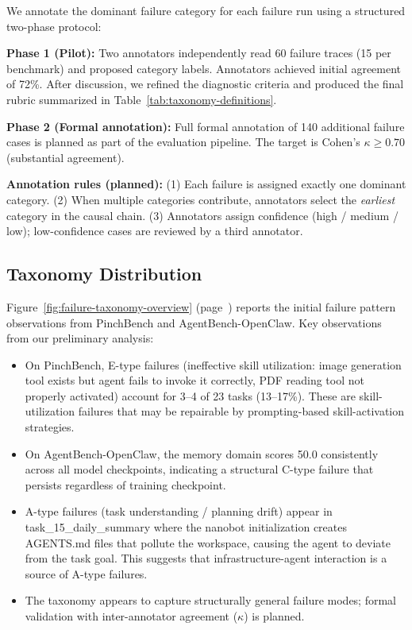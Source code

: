 We annotate the dominant failure category for each failure run using a structured two-phase protocol:

\textbf{Phase 1 (Pilot):} Two annotators independently read 60 failure traces (15 per benchmark) and proposed category labels. Annotators achieved initial agreement of 72\%. After discussion, we refined the diagnostic criteria and produced the final rubric summarized in Table~\ref{tab:taxonomy-definitions}.

\textbf{Phase 2 (Formal annotation):} Full formal annotation of 140 additional failure cases is planned as part of the evaluation pipeline. The target is Cohen's $\kappa \ge 0.70$ (substantial agreement).

\textbf{Annotation rules (planned):} (1) Each failure is assigned exactly one dominant category. (2) When multiple categories contribute, annotators select the \emph{earliest} category in the causal chain. (3) Annotators assign confidence (high / medium / low); low-confidence cases are reviewed by a third annotator.


\subsection{Taxonomy Distribution}
\label{sec:taxonomy:distribution}

Figure~\ref{fig:failure-taxonomy-overview} (page~\pageref{fig:failure-taxonomy-overview}) reports the initial failure pattern observations from PinchBench and AgentBench-OpenClaw. Key observations from our preliminary analysis:

\begin{itemize}[leftmargin=1.5em, itemsep=1pt]
  \item On PinchBench, E-type failures (ineffective skill utilization: image generation tool exists but agent fails to invoke it correctly, PDF reading tool not properly activated) account for 3--4 of 23 tasks (13--17\%). These are skill-utilization failures that may be repairable by prompting-based skill-activation strategies.
  \item On AgentBench-OpenClaw, the memory domain scores 50.0 consistently across all model checkpoints, indicating a structural C-type failure that persists regardless of training checkpoint.
  \item A-type failures (task understanding / planning drift) appear in task\_15\_daily\_summary where the nanobot initialization creates AGENTS.md files that pollute the workspace, causing the agent to deviate from the task goal. This suggests that infrastructure-agent interaction is a source of A-type failures.
  \item The taxonomy appears to capture structurally general failure modes; formal validation with inter-annotator agreement ($\kappa$) is planned.
\end{itemize}

